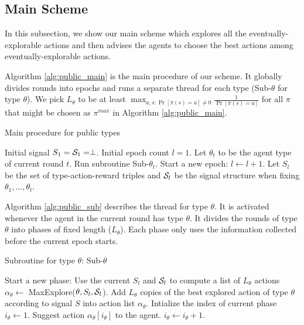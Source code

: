\subsection{Main Scheme}
\label{sec:public_main}
In this subsection, we show our main scheme which explores all the eventually-explorable actions and then advises the agents to choose the best actions among eventually-explorable actions.

Algorithm \ref{alg:public_main} is the main procedure of our scheme. It globally divides rounds into epochs and runs a separate thread for each type (Sub-$\theta$ for type $\theta$). We pick $L_{\theta}$ to be at least $\max_{a,s: \Pr[\pi(s)=a] \neq 0} \frac{1}{\Pr[\pi(s)=a]}$ for all $\pi$ that might be chosen as $\pi^{max}$ in Algorithm \ref{alg:public_main}.
 \begin{algorithm}[H]
    \caption{Main procedure for public types }
    	\label{alg:public_main}
    \begin{algorithmic}[1]
    	\STATE Initial signal $S_1 = \S_1 = \perp$.
	\STATE Initial epoch count $l = 1$. 
		\STATE Let $\theta_t$ to be the agent type of current round $t$. Run subroutine Sub-$\theta_t$.
			\STATE Start a new epoch:
			\STATE $l \leftarrow l + 1$.
			\STATE Let $S_l$ be the set of type-action-reward triples and $\S_l$ be the signal structure when fixing $\theta_1,...,\theta_t$.
		\ENDIF
	\ENDFOR
     \end{algorithmic}
\end{algorithm}

Algorithm \ref{alg:public_sub} describes the thread for type $\theta$. It is activated whenever the agent in the current round has type $\theta$. It divides the rounds of type $\theta$ into phases of fixed length ($L_{\theta}$). Each phase only uses the information collected before the current epoch starts. 

 \begin{algorithm}[H]
    \caption{Subroutine for type $\theta$: Sub-$\theta$ }
    	\label{alg:public_sub}
    \begin{algorithmic}[1]
			\STATE Start a new phase:
				\STATE Use the current $S_l$ and $\S_l$ to compute a list of $L_{\theta}$ actions $\alpha_{\theta} \leftarrow $ MaxExplore($\theta, S_l, \S_l$).
			\ELSE
				\STATE Add $L_{\theta}$ copies of the best explored action of type $\theta$ according to signal $S$ into action list $\alpha_{\theta}$. 
			\ENDIF
			\STATE Intialize the index of current phase $i_{\theta} \leftarrow 1$.
		\ENDIF
		\STATE Suggest action $\alpha_{\theta} [i_{\theta}]$ to the agent.
		\STATE $i_{\theta} \leftarrow i_{\theta} + 1$.
	\ENDFOR
     \end{algorithmic}
\end{algorithm}


